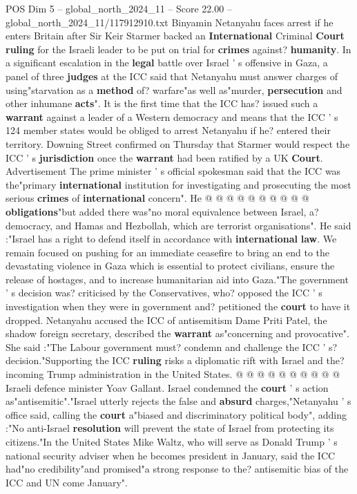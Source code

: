 \begin{textsample}{POS Dim 5 – global\_north\_2024\_11 – Score 22.00 – global\_north\_2024\_11/117912910.txt}  \label{ex:f5_pos_031}
Binyamin Netanyahu faces arrest if he enters Britain after Sir Keir Starmer backed an \textbf{International} Criminal \textbf{Court} \textbf{ruling} for the Israeli leader to be put on trial for \textbf{crimes} against? \textbf{humanity}.
In a significant escalation in the \textbf{legal} battle over Israel ' s offensive in Gaza, a panel of three \textbf{judges} at the ICC said that Netanyahu must answer charges of using"starvation as a \textbf{method} of? warfare"as well as"murder, \textbf{persecution} and other inhumane \textbf{acts}".
It is the first time that the ICC has? issued such a \textbf{warrant} against a leader of a Western democracy and means that the ICC ' s 124 member states would be obliged to arrest Netanyahu if he? entered their territory.
Downing Street confirmed on Thursday that Starmer would respect the ICC ' s \textbf{jurisdiction} once the \textbf{warrant} had been ratified by a UK \textbf{Court}.
Advertisement The prime minister ' s official spokesman said that the ICC was the"primary \textbf{international} institution for investigating and prosecuting the most serious \textbf{crimes} of \textbf{international} concern".
He @ @ @ @ @ @ @ @ @ @ \textbf{obligations}"but added there was"no moral equivalence between Israel, a? democracy, and Hamas and Hezbollah, which are terrorist organisations".
He said :"Israel has a right to defend itself in accordance with \textbf{international} \textbf{law}.
We remain focused on pushing for an immediate ceasefire to bring an end to the devastating violence in Gaza which is essential to protect civilians, ensure the release of hostages, and to increase humanitarian aid into Gaza."The government ' s decision was? criticised by the Conservatives, who? opposed the ICC ' s investigation when they were in government and? petitioned the \textbf{court} to have it dropped.
Netanyahu accused the ICC of antisemitism Dame Priti Patel, the shadow foreign secretary, described the \textbf{warrant} as"concerning and provocative".
She said :"The Labour government must? condemn and challenge the ICC ' s? decision."Supporting the ICC \textbf{ruling} risks a diplomatic rift with Israel and the? incoming Trump administration in the United States. @ @ @ @ @ @ @ @ @ @ Israeli defence minister Yoav Gallant.
Israel condemned the \textbf{court} ' s action as"antisemitic"."Israel utterly rejects the false and \textbf{absurd} charges,"Netanyahu ' s office said, calling the \textbf{court} a"biased and discriminatory political body", adding :"No anti-Israel \textbf{resolution} will prevent the state of Israel from protecting its citizens."In the United States Mike Waltz, who will serve as Donald Trump ' s national security adviser when he becomes president in January, said the ICC had"no credibility"and promised"a strong response to the? antisemitic bias of the ICC and UN come January".

\end{textsample}
